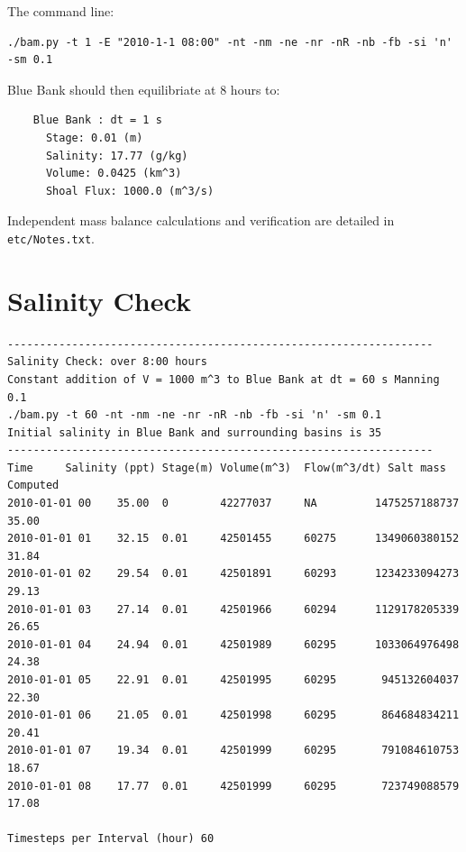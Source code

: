 The command line:

\small
\begin{verbatim}
./bam.py -t 1 -E "2010-1-1 08:00" -nt -nm -ne -nr -nR -nb -fb -si 'n' -sm 0.1
\end{verbatim}
\large

Blue Bank should then equilibriate at 8 hours to:

\small
\begin{verbatim}
    Blue Bank : dt = 1 s
      Stage: 0.01 (m)
      Salinity: 17.77 (g/kg)
      Volume: 0.0425 (km^3)
      Shoal Flux: 1000.0 (m^3/s)
\end{verbatim}
\large

Independent mass balance calculations and verification are detailed in \texttt{etc/Notes.txt}.


\clearpage 
\section{Salinity Check}
\label{sec:Salinty Check}
\small
\begin{verbatim}
------------------------------------------------------------------
Salinity Check: over 8:00 hours
Constant addition of V = 1000 m^3 to Blue Bank at dt = 60 s Manning 0.1
./bam.py -t 60 -nt -nm -ne -nr -nR -nb -fb -si 'n' -sm 0.1
Initial salinity in Blue Bank and surrounding basins is 35
------------------------------------------------------------------
Time     Salinity (ppt) Stage(m) Volume(m^3)  Flow(m^3/dt) Salt mass    Computed
2010-01-01 00    35.00  0        42277037     NA         1475257188737   35.00
2010-01-01 01    32.15  0.01     42501455     60275      1349060380152   31.84
2010-01-01 02    29.54  0.01     42501891     60293      1234233094273   29.13
2010-01-01 03    27.14  0.01     42501966     60294      1129178205339   26.65
2010-01-01 04    24.94  0.01     42501989     60295      1033064976498   24.38
2010-01-01 05    22.91  0.01     42501995     60295       945132604037   22.30
2010-01-01 06    21.05  0.01     42501998     60295       864684834211   20.41
2010-01-01 07    19.34  0.01     42501999     60295       791084610753   18.67
2010-01-01 08    17.77  0.01     42501999     60295       723749088579   17.08
						
Timesteps per Interval (hour) 60
\end{verbatim}
\large

